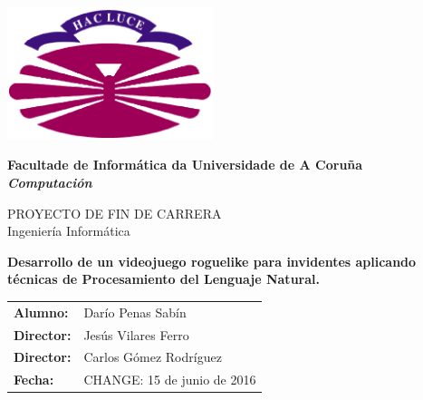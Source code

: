 %
%

%

\begin{titlepage}

	\begin{center}

		\includegraphics[width=6cm]{./eps/logo_udc-eps-converted-to.pdf}
		\vspace{2cm}

		{\Large{\textbf{Facultade de Informática da Universidade de A Coruña}}}
		\\
		{\it \large{\textbf{Computación}}}
		\vspace{1cm}

		{\large PROYECTO DE FIN DE CARRERA\\Ingeniería Informática}
		\vspace{1cm}

		\textbf{\Large Desarrollo de un videojuego roguelike para invidentes aplicando técnicas de Procesamiento del Lenguaje Natural.}
		\vspace{7cm}
	\end{center}

	\begin{flushright}
		\begin{tabular}{ll}
			\large{\textbf{Alumno:}}	&
			\large{Darío Penas Sabín} \\

			\large{\textbf{Director:}}	&
			\large{Jesús Vilares Ferro} \\

			\large{\textbf{Director:}}	&
			\large{Carlos Gómez Rodríguez} \\

			\large{\textbf{Fecha:}}	&
			\large{CHANGE: 15 de junio de 2016} \\
		\end{tabular}
	\end{flushright}

\end{titlepage}

